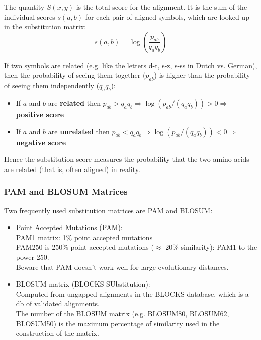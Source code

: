 The quantity $S(x,y)$ is the total score for the alignment.
It is the sum of the individual scores $s(a,b)$ for each pair of aligned symbols, which are looked up in the substitution matrix:
\begin{equation}
s(a,b) = \log \left( \frac{p_{ab}}{q_a q_b} \right)
\end{equation}

If two symbols are related (e.g. like the letters d-t, s-z, s-ss in Dutch vs. German), then the probability of seeing them together ($p_{ab}$) is higher than the probability of seeing them independently ($q_a q_b$):
%
\begin{itemize}
\item If $a$ and $b$ are {\bf related} then $p_{ab} > q_a q_b \Rightarrow \log(p_{ab}/(q_a q_b)) > 0 \Rightarrow$ {\bf positive score}
\item If $a$ and $b$ are {\bf unrelated} then $p_{ab} < q_a q_b \Rightarrow \log(p_{ab}/(q_a q_b)) < 0 \Rightarrow$ {\bf negative score}
\end{itemize}

Hence the substitution score measures the probability that the two amino acids are related (that is, often aligned) in reality.


\subsubsection{PAM and BLOSUM Matrices}

Two frequently used substitution matrices are PAM and BLOSUM:
\begin{itemize}
%
\item Point Accepted Mutations (PAM): \\
PAM1 matrix: 1\% point accepted mutations \\
PAM250 is 250\% point accepted mutations ($\approx$ 20\% similarity): PAM1 to the power 250. \\
Beware that PAM doesn't work well for large evolutionary distances. 
%
\item BLOSUM matrix (BLOCKS SUbstitution): \\
Computed from ungapped alignments in the BLOCKS database, which is a db of validated alignments. \\
The number of the BLOSUM matrix (e.g. BLOSUM80, BLOSUM62, BLOSUM50) is the maximum percentage of similarity used in the construction of the matrix.
%
\end{itemize}

